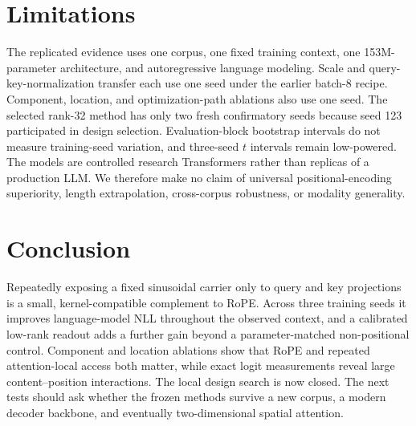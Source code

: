 \documentclass{article}
\begin{document}
\section{Limitations}

The replicated evidence uses one corpus, one fixed training context, one
153M-parameter architecture, and autoregressive language modeling. Scale and
query-key-normalization transfer each use one seed under the earlier batch-8
recipe. Component, location, and optimization-path ablations also use one
seed. The selected rank-32 method has only two fresh confirmatory seeds because
seed 123 participated in design selection. Evaluation-block bootstrap
intervals do not measure training-seed variation, and three-seed $t$ intervals
remain low-powered. The models are controlled research Transformers rather
than replicas of a production LLM. We therefore make no claim of universal
positional-encoding superiority, length extrapolation, cross-corpus
robustness, or modality generality.

\section{Conclusion}

Repeatedly exposing a fixed sinusoidal carrier only to query and key
projections is a small, kernel-compatible complement to RoPE. Across three
training seeds it improves language-model NLL throughout the observed context,
and a calibrated low-rank readout adds a further gain beyond a
parameter-matched non-positional control. Component and location ablations
show that RoPE and repeated attention-local access both matter, while exact
logit measurements reveal large content--position interactions. The local
design search is now closed. The next tests should ask whether the frozen
methods survive a new corpus, a modern decoder backbone, and eventually
two-dimensional spatial attention.



\end{document}
